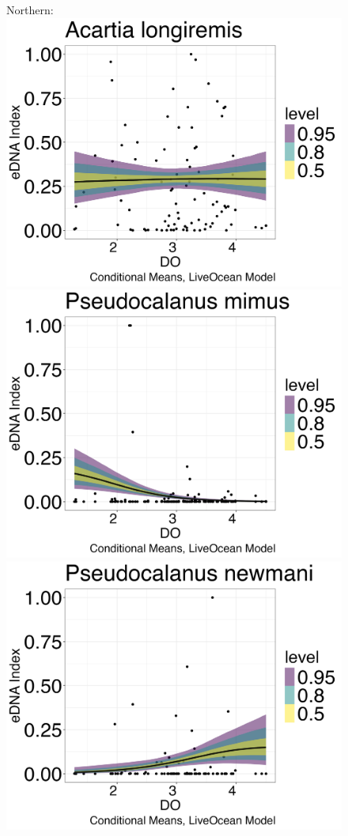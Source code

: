 \documentclass[12pt,twoside]{reedthesis}
\begin{document}
	\begin{figure}[h]
		\begin{center}
			Northern: \\
			\includegraphics[scale=0.25]{Alongiremis_ZOIB_Means_Mod_noOut}
			\includegraphics[scale=0.25]{Pmimus_ZOIB_Means_Mod_noOut}
			\includegraphics[scale=0.25]{Pnewmani_ZOIB_Means_Mod_noOut}

\end{center}
\end{figure}
\end{document}
